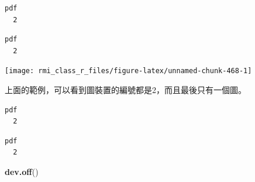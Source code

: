 \documentclass[]{book}
\newenvironment{Shaded}{\begin{snugshade}}{\end{snugshade}}
\newcommand{\KeywordTok}[1]{\textcolor[rgb]{0.13,0.29,0.53}{\textbf{#1}}}
\newcommand{\NormalTok}[1]{#1}
\newcommand{\OperatorTok}[1]{\textcolor[rgb]{0.81,0.36,0.00}{\textbf{#1}}}
\theoremstyle{definition}
\theoremstyle{definition}
\theoremstyle{definition}
\theoremstyle{remark}
\begin{document}
\begin{Shaded}
\end{Shaded}

\begin{verbatim}
pdf 
  2 
\end{verbatim}

\begin{Shaded}
\end{Shaded}

\begin{verbatim}
pdf 
  2 
\end{verbatim}

\begin{center}\texttt{[image: rmi\_class\_r\_files/figure-latex/unnamed-chunk-468-1]} \end{center}

上面的範例，可以看到圖裝置的編號都是2，而且最後只有一個圖。

\begin{Shaded}
\end{Shaded}

\begin{verbatim}
pdf 
  2 
\end{verbatim}

\begin{Shaded}
\end{Shaded}

\begin{verbatim}
pdf 
  2 
\end{verbatim}

\begin{Shaded}
\begin{Highlighting}[]
\KeywordTok{dev.off}\NormalTok{()}
\end{Highlighting}
\end{Shaded}
\end{document}
